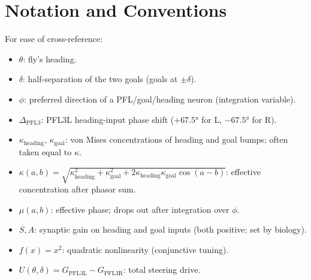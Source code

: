 \documentclass[11pt, a4paper]{article}
\newcommand{\kh}{\kappa_{\mathrm{heading}}}
\newcommand{\kg}{\kappa_{\mathrm{goal}}}
\newcommand{\Dp}{\Delta_{\mathrm{PFL3}}}
\begin{document}
\section*{Notation and Conventions}
\label{sec:notation}

For ease of cross-reference:
\begin{itemize}
  \item $\theta$: fly's heading.
  \item $\delta$: half-separation of the two goals (goals at $\pm\delta$).
  \item $\phi$: preferred direction of a PFL/goal/heading neuron (integration variable).
  \item $\Dp$: PFL3L heading-input phase shift ($+67.5°$ for L, $-67.5°$ for R).
  \item $\kh,\, \kg$: von Mises concentrations of heading and goal bumps; often taken equal to $\kappa$.
  \item $\kappa(a, b) = \sqrt{\kh^2 + \kg^2 + 2\kh\kg\cos(a-b)}$: effective concentration after phasor sum.
  \item $\mu(a, b)$: effective phase; drops out after integration over $\phi$.
  \item $S, A$: synaptic gain on heading and goal inputs (both positive; set by biology).
  \item $f(x) = x^2$: quadratic nonlinearity (conjunctive tuning).
  \item $U(\theta, \delta) = G_{\mathrm{PFL3L}} - G_{\mathrm{PFL3R}}$: total steering drive.
\end{itemize}


\printbibliography
\end{document}
